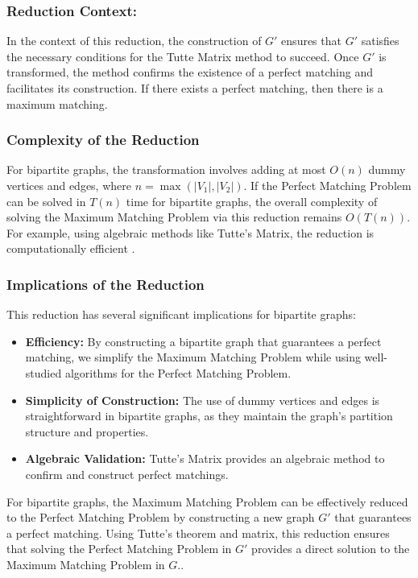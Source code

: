 \subsubsection*{Reduction Context:}
In the context of this reduction, the construction of $G'$ ensures that $G'$ satisfies the necessary conditions for the Tutte Matrix method to succeed. Once $G'$ is transformed, the method confirms the existence of a perfect matching and facilitates its construction. If there exists a perfect matching, then there is a maximum matching.

\subsubsection{Complexity of the Reduction}

For bipartite graphs, the transformation involves adding at most $O(n)$ dummy vertices and edges, where $n = \max(|V_1|, |V_2|)$. If the Perfect Matching Problem can be solved in $T(n)$ time for bipartite graphs, the overall complexity of solving the Maximum Matching Problem via this reduction remains $O(T(n))$. For example, using algebraic methods like Tutte’s Matrix, the reduction is computationally efficient \cite{cormen2009introduction}.

\subsubsection{Implications of the Reduction}

This reduction has several significant implications for bipartite graphs:
\begin{itemize}
    \item \textbf{Efficiency:} By constructing a bipartite graph that guarantees a perfect matching, we simplify the Maximum Matching Problem while using well-studied algorithms for the Perfect Matching Problem.
    \item \textbf{Simplicity of Construction:} The use of dummy vertices and edges is straightforward in bipartite graphs, as they maintain the graph's partition structure and properties.
    \item \textbf{Algebraic Validation:} Tutte’s Matrix provides an algebraic method to confirm and construct perfect matchings.
\end{itemize}

For bipartite graphs, the Maximum Matching Problem can be effectively reduced to the Perfect Matching Problem by constructing a new graph $G'$ that guarantees a perfect matching. Using Tutte's theorem and matrix, this reduction ensures that solving the Perfect Matching Problem in $G'$ provides a direct solution to the Maximum Matching Problem in $G$.\cite{cormen2009introduction, berman1996algorithms, tutte1947some, Geelen2000}.